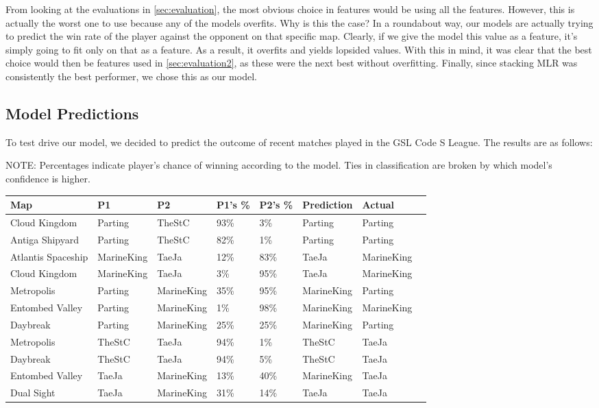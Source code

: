 From looking at the evaluations in \ref{sec:evaluation}, the most obvious choice in features would be using all the features. However, this is actually the worst one to use because any of the models overfits. Why is this the case? In a roundabout way, our models are actually trying to predict the win rate of the player against the opponent on that specific map. Clearly, if we give the model this value as a feature, it's simply going to fit only on that as a feature. As a result, it overfits and yields lopsided values. With this in mind, it was clear that the best choice would then be features used in \ref{sec:evaluation2}, as these were the next best without overfitting. Finally, since stacking MLR was consistently the best performer, we chose this as our model.

\subsection{Model Predictions}
To test drive our model, we decided to predict the outcome of recent matches played in the GSL Code S League. The results are as follows:

NOTE: Percentages indicate player's chance of winning according to the model. Ties in classification are broken by which model's confidence is higher.

\begin{center}
\begin{tabular}{| l | l | l | l | l | l | l | l |}
\hline
Map & P1 & P2 & P1's \% & P2's \% & Prediction & Actual \\
\hline
Cloud Kingdom & Parting & TheStC & 93\% & 3\% & Parting & Parting \\
Antiga Shipyard & Parting & TheStC & 82\% & 1\% & Parting & Parting \\
Atlantis Spaceship & MarineKing & TaeJa & 12\% & 83\% & TaeJa & MarineKing \\
Cloud Kingdom & MarineKing & TaeJa & 3\% & 95\% & TaeJa & MarineKing \\
Metropolis & Parting & MarineKing & 35\% & 95\% & MarineKing & Parting \\
Entombed Valley & Parting & MarineKing & 1\% & 98\% & MarineKing & MarineKing \\
Daybreak & Parting & MarineKing & 25\% & 25\% & MarineKing & Parting \\
Metropolis & TheStC & TaeJa & 94\% & 1\% & TheStC & TaeJa \\
Daybreak & TheStC & TaeJa & 94\% & 5\% & TheStC & TaeJa \\
Entombed Valley & TaeJa & MarineKing & 13\% & 40\% & MarineKing & TaeJa \\
Dual Sight & TaeJa & MarineKing & 31\% & 14\% & TaeJa & TaeJa \\
\hline
\end{tabular}
\end{center}

